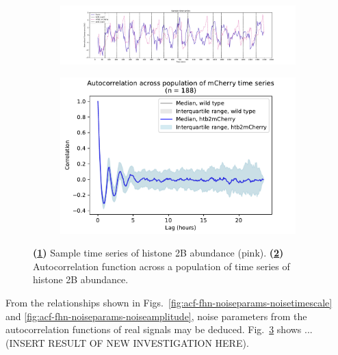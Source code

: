 \begin{figure}
  \centering
  \begin{subfigure}[t]{0.6\textwidth}
  \centering
    \includegraphics[width=\linewidth]{htb2mCherry_26643_plots_purple_01.pdf}
    \caption{
    }
    \label{fig:acf-fhn-biol-ts}
  \end{subfigure}%
  \begin{subfigure}[t]{0.4\textwidth}
  \centering
    \includegraphics[width=\linewidth]{htb2mCherry_26643_plots_mCh_06.png}
    \caption{
    }
    \label{fig:acf-fhn-biol-acf}
  \end{subfigure}

  \caption{
    \textbf{(\ref{fig:acf-fhn-biol-ts})}
    Sample time series of histone 2B abundance (pink).
    \textbf{(\ref{fig:acf-fhn-biol-acf})}
    Autocorrelation function across a population of time series of histone 2B abundance.
  }
  \label{fig:acf-fhn-biol}
\end{figure}

From the relationships shown in Figs.\ \ref{fig:acf-fhn-noiseparams-noisetimescale} and \ref{fig:acf-fhn-noiseparams-noiseamplitude}, noise parameters from the autocorrelation functions of real signals may be deduced.
Fig.\ \ref{fig:acf-fhn-biol} shows ...(INSERT RESULT OF NEW INVESTIGATION HERE).

